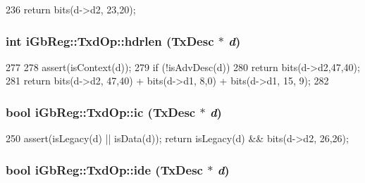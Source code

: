 \begin{DoxyCode}
236 { return bits(d->d2, 23,20); }
\end{DoxyCode}
\hypertarget{namespaceiGbReg_1_1TxdOp_a56155a1a3846877b600c56961f9ce28d}{
\subsubsection[{hdrlen}]{\setlength{\rightskip}{0pt plus 5cm}int iGbReg::TxdOp::hdrlen (TxDesc $\ast$ {\em d})}}
\label{namespaceiGbReg_1_1TxdOp_a56155a1a3846877b600c56961f9ce28d}



\begin{DoxyCode}
277                              {
278     assert(isContext(d)); 
279     if (!isAdvDesc(d))
280         return bits(d->d2,47,40);
281     return bits(d->d2, 47,40) + bits(d->d1, 8,0) + bits(d->d1, 15, 9); 
282 }
\end{DoxyCode}
\hypertarget{namespaceiGbReg_1_1TxdOp_a430ae631041ec0016452d137fef7f758}{
\subsubsection[{ic}]{\setlength{\rightskip}{0pt plus 5cm}bool iGbReg::TxdOp::ic (TxDesc $\ast$ {\em d})}}
\label{namespaceiGbReg_1_1TxdOp_a430ae631041ec0016452d137fef7f758}



\begin{DoxyCode}
250 { assert(isLegacy(d) || isData(d)); return isLegacy(d) && bits(d->d2, 26,26); }
\end{DoxyCode}
\hypertarget{namespaceiGbReg_1_1TxdOp_afdc1f7e3fdd98e21c1d3e3f5a6a06ad4}{
\subsubsection[{ide}]{\setlength{\rightskip}{0pt plus 5cm}bool iGbReg::TxdOp::ide (TxDesc $\ast$ {\em d})}}
\label{namespaceiGbReg_1_1TxdOp_afdc1f7e3fdd98e21c1d3e3f5a6a06ad4}



